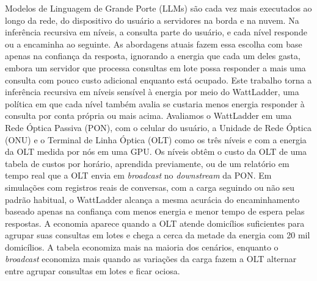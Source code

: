 \documentclass[cic,dipl,english]{infufrgs}
\begin{document}
\begin{translatedabstract}
Modelos de Linguagem de Grande Porte (LLMs) são cada vez mais executados ao longo da rede, do
dispositivo do usuário a servidores na borda e na nuvem. Na inferência recursiva em níveis, a consulta
parte do usuário, e cada nível responde ou a encaminha ao seguinte. As abordagens atuais fazem
essa escolha com base apenas na confiança da resposta, ignorando a energia que cada um deles
gasta, embora um servidor que processa consultas em lote possa responder a mais uma consulta
com pouco custo adicional enquanto está ocupado.
Este trabalho torna a inferência recursiva em níveis sensível à energia por meio do
WattLadder, uma política em que cada nível também avalia se custaria menos energia responder à
consulta por conta própria ou mais acima. Avaliamos o WattLadder em uma Rede Óptica Passiva (PON), com o celular do
usuário, a Unidade de Rede Óptica (ONU) e o Terminal de Linha Óptica (OLT) como os três níveis
e com a energia da OLT medida por nós em uma GPU. Os níveis obtêm o custo da OLT de uma tabela
de custos por horário, aprendida previamente, ou de um relatório em tempo real que a OLT envia em
\textit{broadcast} no \textit{downstream} da PON. Em simulações com registros reais de
conversas, com a carga seguindo ou não seu padrão habitual, o WattLadder alcança a mesma
acurácia do encaminhamento baseado apenas na confiança com menos energia e menor tempo de
espera pelas respostas. A economia aparece quando a OLT atende domicílios suficientes para
agrupar suas consultas em lotes e chega a cerca da metade da energia com 20 mil domicílios.
A tabela economiza mais na maioria dos cenários, enquanto o \textit{broadcast} economiza mais
quando as variações da carga fazem a OLT alternar entre agrupar consultas em lotes e ficar
ociosa.
\par %
\end{translatedabstract}

\tableofcontents

\listoffigures

\listoftables
\end{document}
